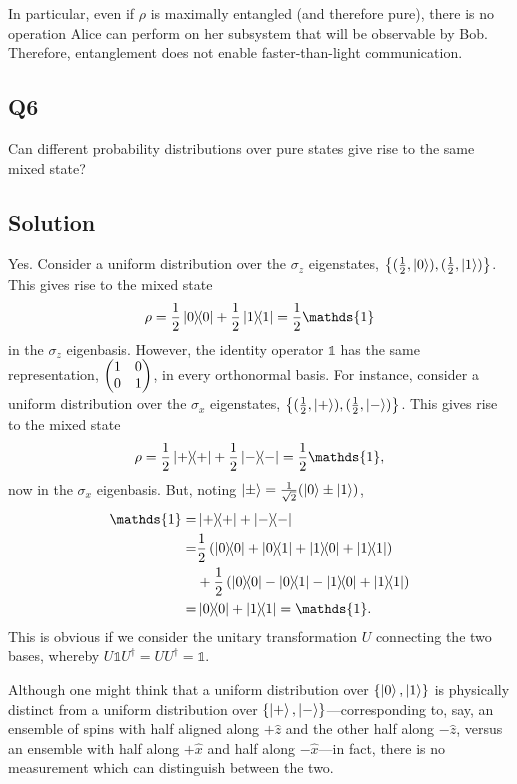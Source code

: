 \documentclass[12pt]{article}
\newcommand*\id{\mathds{1}}
\begin{document}
\begin{appendices}
\begin{enumerate}[label=\alph*)]
In particular, even if $\rho$ is maximally entangled (and therefore pure), there is no operation Alice can perform on her subsystem that will be observable by Bob. Therefore, entanglement does not enable faster-than-light communication.
\end{enumerate}


\subsection*{Q6}
Can different probability distributions over pure states give rise to the same mixed state?

\subsection*{Solution}
Yes. Consider a uniform distribution over the $\sigma_z$ eigenstates,
$\left\{(\frac{1}{2}, \ket{0}), (\frac{1}{2}, \ket{1})\right\}$.
This gives rise to the mixed state
\[\rho = \frac{1}{2}\ketbra{0} + \frac{1}{2}\ketbra{1} = \frac{1}{2}\id\]
in the $\sigma_z$ eigenbasis. However, the identity operator $\id$ has the same representation, $\pmqty{\imat{2}}$, in every orthonormal basis. For instance, consider a uniform distribution over the $\sigma_x$ eigenstates, $\left\{(\frac{1}{2}, \ket{+}), (\frac{1}{2}, \ket{-})\right\}$. This gives rise to the mixed state
\[\rho = \frac{1}{2}\ketbra{+} + \frac{1}{2}\ketbra{-} = \frac{1}{2}\id,\]
now in the $\sigma_x$ eigenbasis. But, noting $\ket{\pm} = \frac{1}{\sqrt{2}}(\ket{0} \pm \ket{1})$,
\begin{align}
    \id =& \ketbra{+} + \ketbra{-} \\
    =& \frac{1}{2}\left( \ketbra{0}{0} + \ketbra{0}{1} + \ketbra{1}{0} + \ketbra{1}{1} \right)\\
    &+ \frac{1}{2}\left( \ketbra{0}{0} - \ketbra{0}{1} - \ketbra{1}{0} + \ketbra{1}{1} \right)\\
    =& \ketbra{0} + \ketbra{1} = \id.
\end{align}
This is obvious if we consider the unitary transformation $U$ connecting the two bases, whereby $U\id U^\dag = UU^\dag = \id$.

Although one might think that a uniform distribution over $\{\ket{0}, \ket{1}\}$ is physically distinct from a uniform distribution over $\{\ket{+}, \ket{-}\}$---corresponding to, say, an ensemble of spins with half aligned along $+\hat{z}$ and the other half along $-\hat{z}$, versus an ensemble with half along $+\hat{x}$ and half along $-\hat{x}$---in fact, there is no measurement which can distinguish between the two.



\end{appendices}
\end{document}
